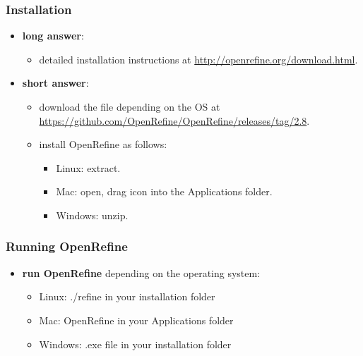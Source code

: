\documentclass{beamer}					%
\begin{document}
\begin{frame}[c]
\frametitle{Installation}
\begin{itemize}
\item \textbf{long answer}:
\begin{itemize}
\item detailed installation instructions at \footnotesize{\url{http://openrefine.org/download.html}}.
\end{itemize}
\item \textbf{short answer}:
\begin{itemize}
\item download the file depending on the OS at \footnotesize{\url{https://github.com/OpenRefine/OpenRefine/releases/tag/2.8}}.
\item install OpenRefine as follows:
\begin{itemize}
\item Linux: extract.
\item Mac: open, drag icon into the Applications folder.
\item Windows: unzip.
\end{itemize}
\end{itemize}
\end{itemize}
\end{frame}

\begin{frame}[c]
\frametitle{Running OpenRefine}
\begin{itemize}
\item \textbf{run OpenRefine} depending on the operating system:
\begin{itemize}
\item Linux: ./refine in your installation folder
\item Mac: OpenRefine in your Applications folder
\item Windows: .exe file in your installation folder
\end{itemize} 
\end{itemize}
\end{frame}
\end{document}
